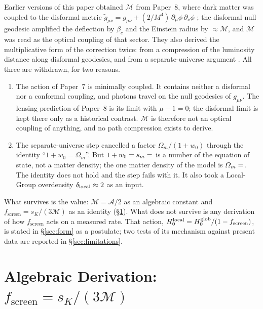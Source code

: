 \documentclass[12pt,a4paper]{article}
\newcommand{\MIRA}{\mathcal{M}}
\newcommand{\AURA}{\mathcal{A}}
\newcommand{\Omm}{\Omega_{m}}
\newcommand{\bc}{\beta_c}
\newcommand{\fsc}{f_{\mathrm{screen}}}
\newcommand{\sK}{s_K}          %
\renewcommand{\Omega}{\varOmega}
\begin{document}
Earlier versions of this paper obtained $\MIRA$ from Paper~8, where dark matter
was coupled to the disformal metric
$\tilde g_{\mu\nu} = g_{\mu\nu} + (2/M^4)\,\partial_\mu\phi\,\partial_\nu\phi$
\citep{Bekenstein1993,Zumalacarregui2014}; the disformal null geodesic amplified
the deflection by $\bc$ and the Einstein radius by $\approx\MIRA$, and $\MIRA$
was read as the optical coupling of that sector. They also derived the
multiplicative form of the correction twice: from a compression of the
luminosity distance along disformal geodesics, and from a separate-universe
argument \citep{Wands2000,Brax2014}. All three are withdrawn, for two reasons.
\begin{enumerate}[label=(\roman*),itemsep=2pt]
  \item The action of Paper~7 is minimally coupled. It contains neither a
        disformal nor a conformal coupling, and photons travel on the null
        geodesics of $g_{\mu\nu}$. The lensing prediction of Paper~8 is its
        limit with $\mu-1=0$; the disformal limit is kept there only as a
        historical contrast. $\MIRA$ is therefore not an optical coupling of
        anything, and no path compression exists to derive.
  \item The separate-universe step cancelled a factor $\Omm/(1+w_0)$ through
        the identity ``$1+w_0=\Omm$''. But $1+w_0=s_m=\val{S_M_d6}$ is a number
        of the equation of state, not a matter density; the one matter density
        of the model is $\Omega_m=\val{OMEGA_M_TOTAL_d6}$. The identity does not
        hold and the step fails with it. It also took a Local-Group
        overdensity $\delta_{\rm local}\approx2$ as an input.
\end{enumerate}
What survives is the value: $\MIRA=\AURA/2$ as an algebraic constant and
$\fsc=\sK/(3\MIRA)$ as an identity (§\ref{sec:identity}). What does not
survive is any derivation of how $\fsc$ acts on a measured rate. That action,
$H_0^{\rm local}=H_0^{\rm glob}/(1-\fsc)$, is stated in §\ref{sec:form} as a
postulate; two tests of its mechanism against present data are reported in
§\ref{sec:limitations}.

\section{Algebraic Derivation: $\fsc = \sK/(3\MIRA)$}
\label{sec:identity}
\end{document}
